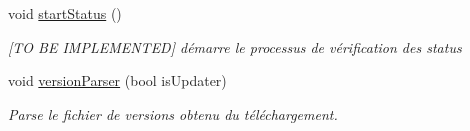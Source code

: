 \begin{DoxyCompactItemize}
\mbox{\label{classmainWindow_a42e2b9a5478b79b77911d1646a7c8204}} 
void \hyperlink{classmainWindow_a42e2b9a5478b79b77911d1646a7c8204}{start\+Status} ()
\begin{DoxyCompactList}\small\item\em \mbox{[}TO BE I\+M\+P\+L\+E\+M\+E\+N\+T\+ED\mbox{]} démarre le processus de vérification des status \end{DoxyCompactList}\item 
void \hyperlink{classmainWindow_a47f43ddb89ca56a42446630e9b7e1153}{version\+Parser} (bool is\+Updater)
\begin{DoxyCompactList}\small\item\em Parse le fichier de versions obtenu du téléchargement. \end{DoxyCompactList}\end{DoxyCompactItemize}
